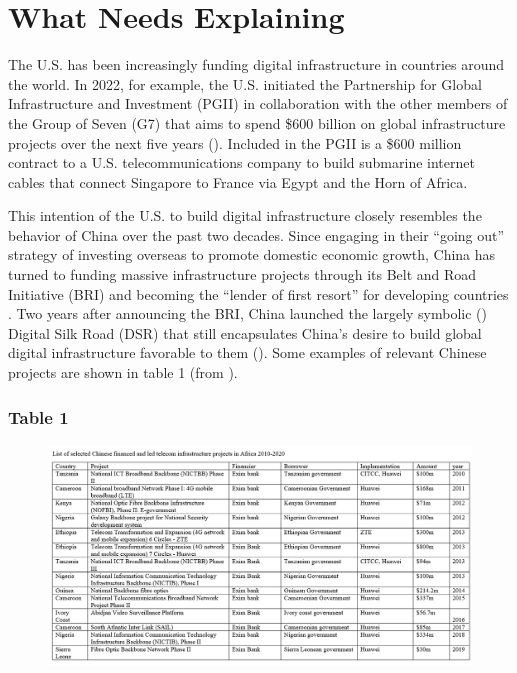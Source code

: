 \documentclass[12pt]{article}
\begin{document}
\section*{What Needs Explaining}
The U.S. has been increasingly funding digital infrastructure in countries around the world. In 2022, for example, the U.S. initiated the Partnership for Global Infrastructure and Investment (PGII) in collaboration with the other members of the Group of Seven (G7) that aims to spend \$600 billion on global infrastructure projects over the next five years (\cite{thewhitehouse2022}). Included in the PGII is a \$600 million contract to a U.S. telecommunications company to build submarine internet cables that connect Singapore to France via Egypt and the Horn of Africa. %

This intention of the U.S. to build digital infrastructure closely resembles the behavior of China over the past two decades. Since engaging in their ``going out'' strategy of investing overseas to promote domestic economic growth, China has turned to funding massive infrastructure projects through its Belt and Road Initiative (BRI) and becoming the ``lender of first resort'' for developing countries \parencite[1]{dreher2022}. Two years after announcing the BRI, China launched the largely symbolic (\cite{tugendhat2021}) Digital Silk Road (DSR) that still encapsulates China's desire to build global digital infrastructure favorable to them (\cite{shen2022}). Some examples of relevant Chinese projects are shown in table 1 (from \cite{agbebi2022}).

\subsubsection*{Table 1}
\begin{figure}[htbp]
    \includegraphics[scale=0.449]{Figures/ChineseAid.png}
\end{figure}
\end{document}

